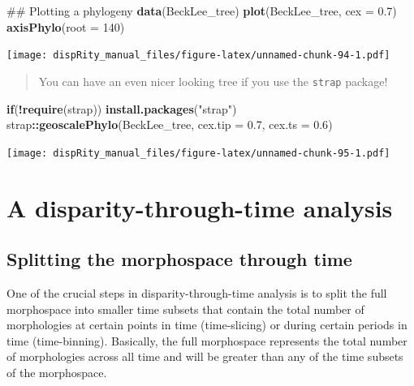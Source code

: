 \documentclass[]{book}
\newenvironment{Shaded}{\begin{snugshade}}{\end{snugshade}}
\newcommand{\KeywordTok}[1]{\textcolor[rgb]{0.13,0.29,0.53}{\textbf{#1}}}
\newcommand{\DataTypeTok}[1]{\textcolor[rgb]{0.13,0.29,0.53}{#1}}
\newcommand{\DecValTok}[1]{\textcolor[rgb]{0.00,0.00,0.81}{#1}}
\newcommand{\FloatTok}[1]{\textcolor[rgb]{0.00,0.00,0.81}{#1}}
\newcommand{\StringTok}[1]{\textcolor[rgb]{0.31,0.60,0.02}{#1}}
\newcommand{\ControlFlowTok}[1]{\textcolor[rgb]{0.13,0.29,0.53}{\textbf{#1}}}
\newcommand{\OperatorTok}[1]{\textcolor[rgb]{0.81,0.36,0.00}{\textbf{#1}}}
\newcommand{\NormalTok}[1]{#1}
\theoremstyle{definition}
\theoremstyle{definition}
\theoremstyle{remark}
\begin{document}
\begin{Shaded}
\begin{Highlighting}[]
\NormalTok{## Plotting a phylogeny}
\KeywordTok{data}\NormalTok{(BeckLee_tree)}
\KeywordTok{plot}\NormalTok{(BeckLee_tree, }\DataTypeTok{cex =} \FloatTok{0.7}\NormalTok{)}
\KeywordTok{axisPhylo}\NormalTok{(}\DataTypeTok{root =} \DecValTok{140}\NormalTok{)}
\end{Highlighting}
\end{Shaded}

\texttt{[image: dispRity\_manual\_files/figure-latex/unnamed-chunk-94-1.pdf]}

\begin{quote}
You can have an even nicer looking tree if you use the \texttt{strap}
package!
\end{quote}

\begin{Shaded}
\begin{Highlighting}[]
\ControlFlowTok{if}\NormalTok{(}\OperatorTok{!}\KeywordTok{require}\NormalTok{(strap)) }\KeywordTok{install.packages}\NormalTok{(}\StringTok{"strap"}\NormalTok{)}
\NormalTok{strap}\OperatorTok{::}\KeywordTok{geoscalePhylo}\NormalTok{(BeckLee_tree, }\DataTypeTok{cex.tip =} \FloatTok{0.7}\NormalTok{, }\DataTypeTok{cex.ts =} \FloatTok{0.6}\NormalTok{)}
\end{Highlighting}
\end{Shaded}

\texttt{[image: dispRity\_manual\_files/figure-latex/unnamed-chunk-95-1.pdf]}

\section{A disparity-through-time
analysis}\label{a-disparity-through-time-analysis}

\subsection{Splitting the morphospace through
time}\label{splitting-the-morphospace-through-time}

One of the crucial steps in disparity-through-time analysis is to split
the full morphospace into smaller time subsets that contain the total
number of morphologies at certain points in time (time-slicing) or
during certain periods in time (time-binning). Basically, the full
morphospace represents the total number of morphologies across all time
and will be greater than any of the time subsets of the morphospace.
\end{document}
